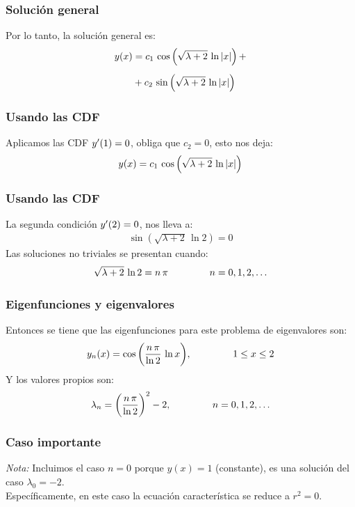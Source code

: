 \documentclass[12pt]{beamer}
\begin{document}
\begin{frame}
\frametitle{Solución general}
Por lo tanto, la solución general es:
\pause
\begin{align}
\begin{aligned}
y(x) &= c_{1} \, \cos \left( \sqrt{\lambda + 2} \, \ln \abs{x} \right) + \\[0.5em]
&+ c_{2} \, \sin \left( \sqrt{\lambda + 2} \, \ln \abs{x} \right)
\end{aligned}
\label{eq:ecuacion_04_15}
\end{align}
\end{frame}
\begin{frame}
\frametitle{Usando las CDF}
Aplicamos las CDF ${y}^{\prime}(1) = 0$, \pause obliga que $c_{2} = 0$, esto nos deja:
\pause
\begin{align*}
y(x) = c_{1} \, \cos \left( \sqrt{\lambda + 2} \, \ln \abs{x} \right)
\end{align*}
\end{frame}
\begin{frame}
\frametitle{Usando las CDF}
La segunda condición ${y}^{\prime}(2) = 0$, nos lleva a:
\pause
\begin{align*}
\sin \left( \sqrt{\lambda + 2} \, \ln 2 \right) = 0
\end{align*}
\pause
Las soluciones no triviales se presentan cuando:
\pause
\begin{align*}
\sqrt{\lambda + 2} \, \ln 2 = n \, \pi \hspace{1.5cm} n = 0, 1, 2, \ldots
\end{align*}
\end{frame}
\begin{frame}
\frametitle{Eigenfunciones y eigenvalores}
Entonces se tiene que las eigenfunciones para este problema de eigenvalores son:
\pause
\begin{align*}
y_{n}(x) = \cos \bigg( \dfrac{n \, \pi}{\ln 2} \, \ln x \bigg), \hspace{1.5cm} 1 \leq x \leq 2
\end{align*}
\pause
Y los valores propios son:
\pause
\begin{align*}
\lambda_{n} = \bigg( \dfrac{n \, \pi}{\ln 2} \bigg)^{2} - 2, \hspace{1.5cm} n = 0, 1, 2, \ldots
\end{align*}
\end{frame}
\begin{frame}
\frametitle{Caso importante}
\emph{Nota:} Incluimos el caso $n = 0$ porque \break \hfill $y (x) = 1$ (constante), es una solución del caso \break \hfill $\lambda_{0} = - 2$.
\\
\bigskip
\pause
Específicamente, en este caso la ecuación característica se reduce a $r^{2} = 0$.
\end{frame}
\end{document}
